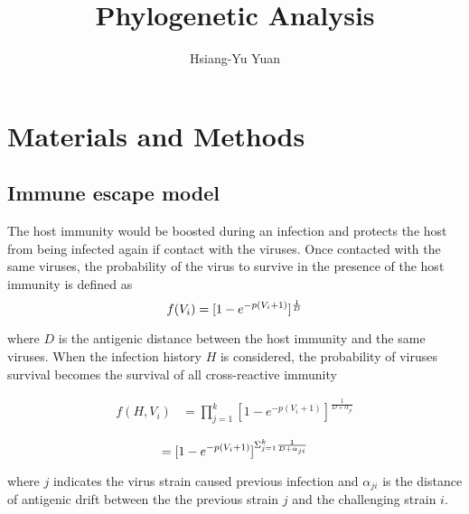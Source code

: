 \documentclass{article}
\begin{document}
\title{Phylogenetic Analysis}
\author{Hsiang-Yu Yuan}
\maketitle


\nocite{*}

\doublespacing
\begin{abstract}
\end{abstract}






\section{Materials and Methods}

\subsection{Immune escape model}

The host immunity would be boosted during an infection and protects the host from being infected again if contact with the viruses. Once contacted with the same viruses, the probability of the virus to survive in the presence of the host immunity is defined as
\begin{equation}
    \label{simple_equation}
    f(V_{i}) = [1-e^{-p(V_{i}+1)}]^{\frac{1}{D}} \\
\end{equation}

where $D$ is the antigenic distance between the host immunity and the same viruses. When the infection history $H$ is considered, the probability of viruses survival becomes the survival of all cross-reactive immunity

\begin{equation}
    \label{simple_equation}
    \begin{split}
    f(H,V_{i}) &= \prod_{j=1}^{k} [1-e^{-p(V_{i}+1)}]^{\frac{1}{D+\alpha_{ji}}} \\
    \end{split}
\end{equation}
\begin{equation}
\space = [1-e^{-p(V_{i}+1)}]^{\Sigma_{j=1}^{k}\frac{1}{D+\alpha_{ji}}} \\
\end{equation}

where $j$ indicates the virus strain caused previous infection and $\alpha_{ji}$ is the distance of antigenic drift between the the previous strain $j$ and the challenging strain $i$.
\end{document}
